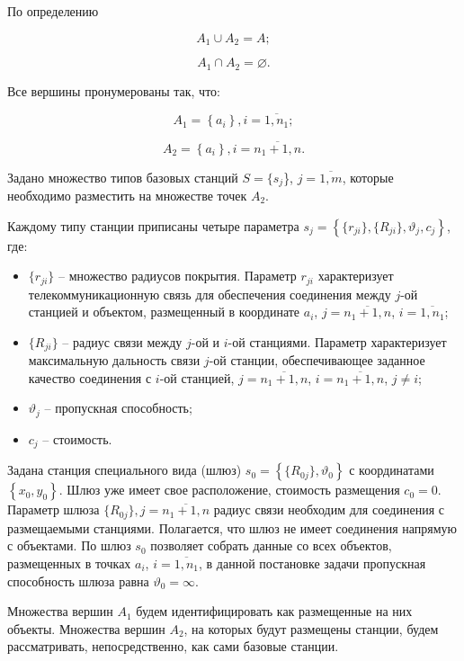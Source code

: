 По определению

$$
A_1 \cup A_2 = A;
$$

$$
A_1 \cap A_2 = \varnothing.
$$

Все вершины пронумерованы так, что:

$$
A_1 = \left\{a_i \right\}, i= \overline{1,n_1};
$$

$$
A_2 = \left\{ a_i  \right\}, i= \overline{n_1+1,n}.
$$


Задано множество типов базовых станций $S = \{s_j$\}, $j=\overline{1,m}$, которые необходимо разместить на множестве точек $A_2$.

Каждому типу станции приписаны четыре параметра $s_j = \left\{\{r_{ji}\}, \{R_{ji}\}, \vartheta_j, c_j \right\}$, где: 
\begin{itemize}
    \item $\{r_{ji}\}$ -- множество радиусов покрытия. Параметр $r_{ji}$ характеризует телекоммуникационную связь для обеспечения соединения между $j$-ой станцией и объектом, размещенный в координате $a_i$, $j= \overline{n_1+1,n}$, $i= \overline{1,n_1}$;
    \item $\{R_{ji}\}$ -- радиус связи между $j$-ой и $i$-ой станциями. Параметр характеризует максимальную дальность связи $j$-ой станции, обеспечивающее заданное качество соединения с $i$-ой станцией, $j= \overline{n_1+1,n}$, $i= \overline{n_1+1,n}$, $j \neq i$;
    \item $\vartheta_j$ -- пропускная способность;
    \item $c_j$ -- стоимость.
\end{itemize}


Задана станция специального вида (шлюз) $s_0 = \left\{ \{R_{0j}\}, \vartheta_0 \right\}$ с координатами $\left\{x_0, y_0 \right\}$. Шлюз уже имеет свое расположение, стоимость размещения $c_0 = 0$. Параметр шлюза $\{R_{0j}\}, j = \overline{n_1+1,n}$ радиус связи необходим для соединения с размещаемыми станциями. Полагается, что шлюз не имеет соединения напрямую с объектами. По шлюз $s_0$ позволяет собрать данные со всех объектов, размещенных в точках $a_i$, $i= \overline{1,n_1}$, в данной постановке задачи пропускная способность шлюза равна $\vartheta_0 = \infty$.


Множества вершин $A_1$ будем идентифицировать как размещенные на них объекты. Множества вершин $A_2$, на которых будут размещены станции, будем рассматривать, непосредственно, как сами базовые станции. 

